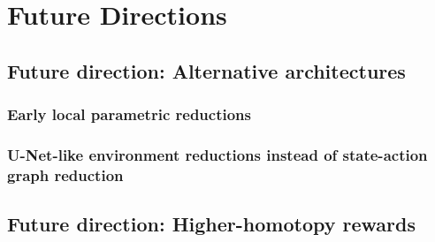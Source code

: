 \documentclass[11pt]{article}
\begin{document}
\section{Future Directions}

\subsection{Future direction: Alternative architectures}

\subsubsection{Early local parametric reductions}

\subsubsection{U-Net-like environment reductions instead of state-action graph reduction}

\subsection{Future direction: Higher-homotopy rewards}

\cite{MalikThesis}



\end{document}

